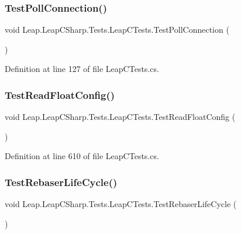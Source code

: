 \subsubsection{\texorpdfstring{TestPollConnection()}{TestPollConnection()}}
{\footnotesize\ttfamily void Leap.\+Leap\+C\+Sharp.\+Tests.\+Leap\+C\+Tests.\+Test\+Poll\+Connection (\begin{DoxyParamCaption}{ }\end{DoxyParamCaption})}



Definition at line 127 of file Leap\+C\+Tests.\+cs.

\mbox{\label{class_leap_1_1_leap_c_sharp_1_1_tests_1_1_leap_c_tests_accf1499cc14bcc1ced1847bc9117efb8}} 
\subsubsection{\texorpdfstring{TestReadFloatConfig()}{TestReadFloatConfig()}}
{\footnotesize\ttfamily void Leap.\+Leap\+C\+Sharp.\+Tests.\+Leap\+C\+Tests.\+Test\+Read\+Float\+Config (\begin{DoxyParamCaption}{ }\end{DoxyParamCaption})}



Definition at line 610 of file Leap\+C\+Tests.\+cs.

\mbox{\label{class_leap_1_1_leap_c_sharp_1_1_tests_1_1_leap_c_tests_a2a8d719baeeb77249e0f524e68dce6e9}} 
\subsubsection{\texorpdfstring{TestRebaserLifeCycle()}{TestRebaserLifeCycle()}}
{\footnotesize\ttfamily void Leap.\+Leap\+C\+Sharp.\+Tests.\+Leap\+C\+Tests.\+Test\+Rebaser\+Life\+Cycle (\begin{DoxyParamCaption}{ }\end{DoxyParamCaption})}



